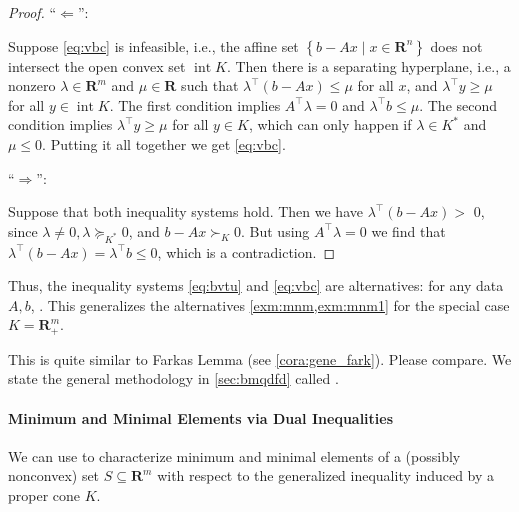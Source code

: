 \documentclass{article}
\newcommand{\inte}{\operatorname{int}}
\begin{document}
\begin{proof}\color{ForestGreen}
``$\Leftarrow$'':

Suppose \cref{eq:vbc} is infeasible, i.e., the affine set $\left\{b-A x \mid x \in \mathbf{R}^{n}\right\}$ does not intersect the open convex set $\operatorname{int} K$. Then there is a separating hyperplane, i.e., a nonzero $\lambda \in \mathbf{R}^{m}$ and $\mu \in \mathbf{R}$ such that $\lambda^{\top}(b-A x) \leq \mu$ for all $x$, and $\lambda^{\top} y \geq \mu$ for all $y \in\inte K$. The first condition implies $A^{\top} \lambda=0$ and $\lambda^{\top} b \leq \mu .$ The second condition implies $\lambda^{\top} y \geq \mu$ for all $y \in K$, which can only happen if $\lambda \in K^{*}$ and $\mu \leq 0$.
Putting it all together we get \cref{eq:vbc}.

``$\Rightarrow$'':

Suppose that both inequality systems hold. Then we have $\lambda^{\top}(b-A x)>$ 0, since $\lambda \neq 0, \lambda \succeq_{K^{*}} 0$, and $b-A x \succ_{K} 0 .$ But using $A^{\top} \lambda=0$ we find that $\lambda^{\top}(b-A x)=\lambda^{\top} b \leq 0$, which is a contradiction.

\end{proof}

\begin{rema}
Thus, the inequality systems \cref{eq:bvtu} and \cref{eq:vbc} are alternatives: for any data $A, b$, . This generalizes the alternatives \cref{exm:mnm,exm:mnm1} for the special case $K=\mathbf{R}_{+}^{m}$.

This is quite similar to Farkas Lemma (see \cref{cora:gene_fark}). Please compare.  We state the general methodology in \cref{sec:bmqdfd} called .
\end{rema}
  
\paragraph{Minimum and Minimal Elements via Dual Inequalities}\label{sec:yiiue}
We can use  to characterize minimum and minimal elements of a (possibly nonconvex) set $S \subseteq \mathbf{R}^{m}$ with respect to the generalized inequality induced by a proper cone $K$.
\end{document}
